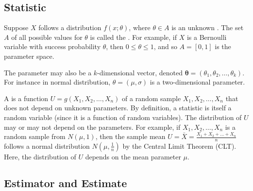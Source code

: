 \subsection{Statistic}

Suppose \( X \) follows a distribution \( f(x; \theta) \), where \( \theta \in A \) is an unknown .
The set \( A \) of all possible values for \( \theta \) is called the .
For example, if \( X \) is a Bernoulli variable with success probability \( \theta \),
then \( 0 \leq \theta \leq 1 \), and so \( A = [0, 1] \) is the parameter space.


The parameter may also be a \( k \)-dimensional vector, denoted \( \bm{\theta} = (\theta_1, \theta_2, \ldots, \theta_k) \).
For instance in normal distribution, \( \theta = (\mu, \sigma) \) is a two-dimensional parameter.

A  is a function \( U = g(X_1, X_2, \ldots, X_n) \) of a random sample \( X_1, X_2, \ldots, X_n \) that does not depend on unknown parameters.
By definition, a statistic is itself a random variable (since it is a function of random variables).
The distribution of \( U \) may or may not depend on the parameters.
For example, if \( X_1, X_2, \ldots, X_n \) is a random sample from \( N(\mu, 1) \),
then the sample mean \( U = \bar{X} = \frac{X_1 + X_2 + \ldots + X_n}{n} \) follows a normal distribution \( N(\mu, \frac{1}{n}) \) by the Central Limit Theorem (CLT).
Here, the distribution of \( U \) depends on the mean parameter \( \mu \).

\subsection{Estimator and Estimate}